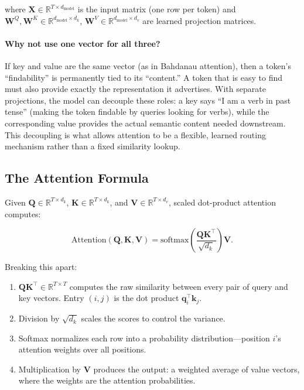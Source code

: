 where $\mathbf{X} \in \mathbb{R}^{T \times d_{\text{model}}}$ is the input matrix (one row per token) and $\mathbf{W}^Q, \mathbf{W}^K \in \mathbb{R}^{d_{\text{model}} \times d_k}$, $\mathbf{W}^V \in \mathbb{R}^{d_{\text{model}} \times d_v}$ are learned projection matrices.

\paragraph{Why not use one vector for all three?} If key and value are the same vector (as in Bahdanau attention), then a token's ``findability'' is permanently tied to its ``content.'' A token that is easy to find must also provide exactly the representation it advertises. With separate projections, the model can decouple these roles: a key says ``I am a verb in past tense'' (making the token findable by queries looking for verbs), while the corresponding value provides the actual semantic content needed downstream. This decoupling is what allows attention to be a flexible, learned routing mechanism rather than a fixed similarity lookup.

\subsection{The Attention Formula}

Given $\mathbf{Q} \in \mathbb{R}^{T \times d_k}$, $\mathbf{K} \in \mathbb{R}^{T \times d_k}$, and $\mathbf{V} \in \mathbb{R}^{T \times d_v}$, scaled dot-product attention computes:

\[
\text{Attention}(\mathbf{Q}, \mathbf{K}, \mathbf{V}) = \text{softmax}\!\left(\frac{\mathbf{Q}\mathbf{K}^\top}{\sqrt{d_k}}\right) \mathbf{V}.
\]

Breaking this apart:

\begin{enumerate}
    \item $\mathbf{Q}\mathbf{K}^\top \in \mathbb{R}^{T \times T}$ computes the raw similarity between every pair of query and key vectors. Entry $(i, j)$ is the dot product $\mathbf{q}_i^\top \mathbf{k}_j$.
    \item Division by $\sqrt{d_k}$ scales the scores to control the variance.
    \item Softmax normalizes each row into a probability distribution---position $i$'s attention weights over all positions.
    \item Multiplication by $\mathbf{V}$ produces the output: a weighted average of value vectors, where the weights are the attention probabilities.
\end{enumerate}

